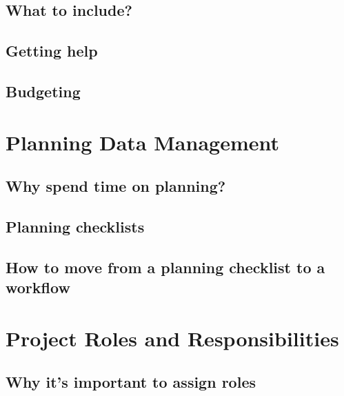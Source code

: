 \documentclass[
]{book}
\begin{document}
\hypertarget{what-to-include}{%
\section{What to include?}\label{what-to-include}}

\hypertarget{getting-help}{%
\section{Getting help}\label{getting-help}}

\hypertarget{budgeting}{%
\section{Budgeting}\label{budgeting}}

\hypertarget{planning-data-management}{%
\chapter{Planning Data Management}\label{planning-data-management}}

\hypertarget{why-spend-time-on-planning}{%
\section{Why spend time on planning?}\label{why-spend-time-on-planning}}

\hypertarget{planning-checklists}{%
\section{Planning checklists}\label{planning-checklists}}

\hypertarget{how-to-move-from-a-planning-checklist-to-a-workflow}{%
\section{How to move from a planning checklist to a workflow}\label{how-to-move-from-a-planning-checklist-to-a-workflow}}

\hypertarget{project-roles-and-responsibilities}{%
\chapter{Project Roles and Responsibilities}\label{project-roles-and-responsibilities}}

\hypertarget{why-its-important-to-assign-roles}{%
\section{Why it's important to assign roles}\label{why-its-important-to-assign-roles}}
\end{document}
